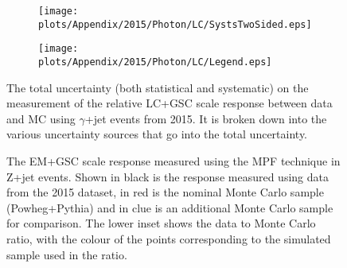 \begin{figure}[!ht]
\captionsetup[subfigure]{labelformat=empty}
 \begin{center}
   \begin{subfigure}{0.55\textwidth}
     \hspace{-3cm}
     \texttt{[image: plots/Appendix/2015/Photon/LC/SystsTwoSided.eps]}
   \end{subfigure}
   \begin{subfigure}{0.55\textwidth}
     \hspace{-3cm}
     \texttt{[image: plots/Appendix/2015/Photon/LC/Legend.eps]}
   \end{subfigure}
 \end{center}
 \caption[Uncertainty on the LC+GSC scale response measurement using $\gamma$+jet]
 {\small The total uncertainty (both statistical and systematic) on the measurement of the relative LC+GSC scale response between data and MC using $\gamma$+jet events from 2015.  It is broken down into the various uncertainty sources that go into the total uncertainty.  }
 \label{Fig:GammaJetSystsLC2015}
\end{figure}

\begin{figure}[!ht]
  \begin{center}
  \end{center}
  \caption[EM scale response using Z+jet in 2015]
  {\small The EM+GSC scale response measured using the MPF technique in Z+jet events.  Shown in black is the response measured using data from the 2015 dataset, in red is the nominal Monte Carlo sample (Powheg+Pythia) and in clue is an additional Monte Carlo sample for comparison.  The lower inset shows the data to Monte Carlo ratio, with the colour of the points corresponding to the simulated sample used in the ratio.  }
  \label{plot:ZJetEM2015App}
\end{figure}


